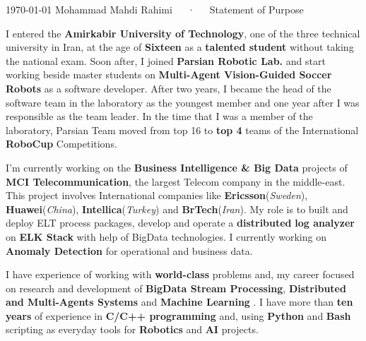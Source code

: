 \documentclass[11pt, a4paper]{awesome-cv}
\begin{document}
\makecvheader[R]

\makecvfooter
  {\today}
  {Mohammad Mahdi Rahimi~~~·~~~Statement of Purpose}
  {}

\makelettertitle

\begin{cvletter}
I entered the \textbf{Amirkabir University of Technology}, one of the three technical university in Iran, at the age of \textbf{Sixteen} as a \textbf{talented student} without taking the national exam. Soon after, I joined \textbf{Parsian Robotic Lab.} and start working beside master students on \textbf{Multi-Agent Vision-Guided Soccer Robots} as a software developer. After two years, I became the head of the software team in the laboratory as the youngest member and one year after I was responsible as the team leader.
In the time that I was a member of the laboratory, Parsian Team moved from top 16 to \textbf{top 4} teams of the International \textbf{RoboCup} Competitions.

I'm currently working on the \textbf{Business Intelligence \& Big Data} projects of \textbf{MCI Telecommunication}, the largest Telecom company in the middle-east. This project involves International companies like \textbf{Ericsson}(\textit{Sweden}), \textbf{Huawei}(\textit{China}), \textbf{Intellica}(\textit{Turkey}) and \textbf{BrTech}(\textit{Iran}). My role is to built and deploy ELT process packages, develop and operate a \textbf{distributed} \textbf{log analyzer} on \textbf{ELK Stack} with help of BigData technologies. I currently working on \textbf{Anomaly Detection} for operational and business data.

I have experience of working with \textbf{world-class} problems and, my career focused on research and development of \textbf{BigData Stream Processing}, \textbf{Distributed and Multi-Agents Systems} and \textbf{Machine Learning} . I have more than \textbf{ten years} of experience in \textbf{C/C++ programming} and, using \textbf{Python} and \textbf{Bash} scripting as everyday tools for \textbf{Robotics} and \textbf{AI} projects.


\end{cvletter}
\end{document}
